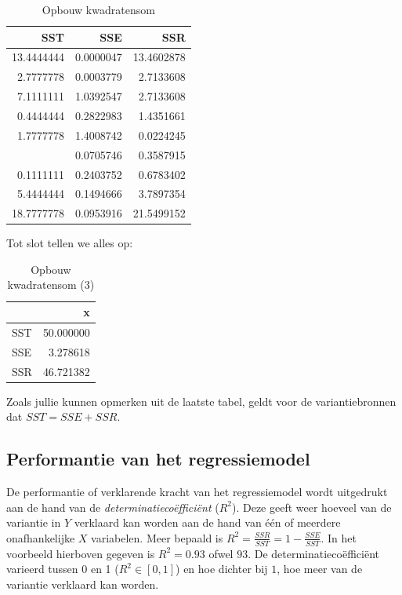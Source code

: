 \documentclass[
]{book}
\theoremstyle{definition}
\theoremstyle{definition}
\theoremstyle{definition}
\theoremstyle{definition}
\theoremstyle{remark}
\begin{document}
\begin{table}

\caption{\label{tab:unnamed-chunk-11}Opbouw kwadratensom}
\centering
\begin{tabular}[t]{rrr}
\toprule
SST & SSE & SSR\\
\midrule
13.4444444 & 0.0000047 & 13.4602878\\
2.7777778 & 0.0003779 & 2.7133608\\
7.1111111 & 1.0392547 & 2.7133608\\
0.4444444 & 0.2822983 & 1.4351661\\
1.7777778 & 1.4008742 & 0.0224245\\
\addlinespace
0.1111111 & 0.0705746 & 0.3587915\\
0.1111111 & 0.2403752 & 0.6783402\\
5.4444444 & 0.1494666 & 3.7897354\\
18.7777778 & 0.0953916 & 21.5499152\\
\bottomrule
\end{tabular}
\end{table}

Tot slot tellen we alles op:

\begin{table}

\caption{\label{tab:unnamed-chunk-12}Opbouw kwadratensom (3)}
\centering
\begin{tabular}[t]{lr}
\toprule
  & x\\
\midrule
SST & 50.000000\\
SSE & 3.278618\\
SSR & 46.721382\\
\bottomrule
\end{tabular}
\end{table}

Zoals jullie kunnen opmerken uit de laatste tabel, geldt voor de variantiebronnen dat \(SST = SSE + SSR\).

\newpage

\hypertarget{performantie-van-het-regressiemodel}{%
\subsection*{Performantie van het regressiemodel}\label{performantie-van-het-regressiemodel}}


De performantie of verklarende kracht van het regressiemodel wordt uitgedrukt aan de hand van de \emph{determinatiecoëfficiënt} (\(R^2\)). Deze geeft weer hoeveel van de variantie in \(Y\) verklaard kan worden aan de hand van één of meerdere onafhankelijke \(X\) variabelen. Meer bepaald is \(R^2 = \frac{SSR}{SST} = 1 - \frac{SSE}{SST}\). In het voorbeeld hierboven gegeven is \(R^2 = 0.93\) ofwel \(93%
\). De determinatiecoëfficiënt varieerd tussen 0 en 1 (\(R^2 \in [0,1]\)) en hoe dichter bij \(1\), hoe meer van de variantie verklaard kan worden.
\end{document}

